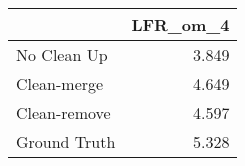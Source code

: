 \begin{tabular}{lr}
\toprule
{} & LFR_om_4 \\
\midrule
No Clean Up  &    3.849 \\
Clean-merge  &    4.649 \\
Clean-remove &    4.597 \\
Ground Truth &    5.328 \\
\bottomrule
\end{tabular}

